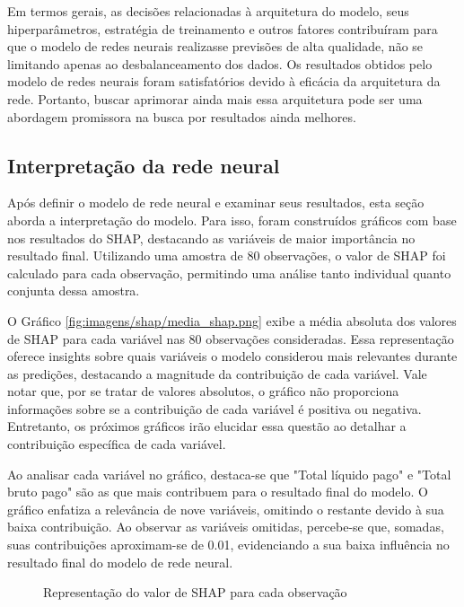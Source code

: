 Em termos gerais, as decisões relacionadas à arquitetura do modelo, seus hiperparâmetros, 
estratégia de treinamento e outros fatores contribuíram para que o modelo de redes neurais realizasse previsões
de alta qualidade, não se limitando apenas ao desbalanceamento dos dados. Os resultados obtidos pelo modelo de redes
neurais foram satisfatórios devido à eficácia da arquitetura da rede. Portanto, buscar aprimorar ainda mais essa 
arquitetura pode ser uma abordagem promissora na busca por resultados ainda melhores.

\subsection{Interpretação da rede neural}


Após definir o modelo de rede neural e examinar seus resultados, esta seção aborda a interpretação do modelo. 
Para isso, foram construídos gráficos com base nos resultados do SHAP, destacando as variáveis de maior importância
 no resultado final. Utilizando uma amostra de 80 observações, o valor de SHAP foi calculado para cada observação, 
 permitindo uma análise tanto individual quanto conjunta dessa amostra.



O Gráfico \ref{fig:imagens/shap/media_shap.png} exibe a média absoluta dos valores de SHAP para cada variável nas
80 observações consideradas. Essa representação oferece insights sobre quais variáveis o modelo considerou mais
relevantes durante as predições, destacando a magnitude da contribuição de cada variável. Vale notar que, por 
se tratar de valores absolutos, o gráfico não proporciona informações sobre se a contribuição de cada variável
é positiva ou negativa. Entretanto, os próximos gráficos irão elucidar essa questão ao detalhar a contribuição 
específica de cada variável.

Ao analisar cada variável no gráfico, destaca-se que "Total líquido pago" e "Total bruto pago" são as que mais
contribuem para o resultado final do modelo. O gráfico enfatiza a relevância de nove variáveis, omitindo 
o restante devido à sua baixa contribuição. Ao observar as variáveis omitidas, percebe-se que, somadas, 
suas contribuições aproximam-se de 0.01, evidenciando a sua baixa influência no resultado final do modelo de rede neural.


\begin{figure}[H]
  \centering
  \vspace{.5cm}
  \vspace{.5cm}
  
  \label{fig:shap_cada_obs}
  \caption{Representação do valor de SHAP para cada observação}
\end{figure}

